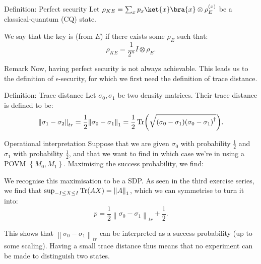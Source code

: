 \documentclass[a4paper]{article}
\begin{document}
\begin{parag}{Definition: Perfect security}
    Let $\rho_{KE} = \sum_{x} p_x \ket{x}\bra{x} \otimes \rho_E^{\left(x\right)}$ be a classical-quantum (CQ) state.

    We say that the key is  (from $E$) if there exists some $\rho_E$ such that:
    \[\rho_{KE} = \frac{1}{2^n} I \otimes \rho_E.\]

    \begin{subparag}{Remark}
        Now, having perfect security is not always achievable. This leads us to the definition of $\epsilon$-security, for which we first need the definition of trace distance.
    \end{subparag}
\end{parag}

\begin{parag}{Definition: Trace distance}
    Let $\sigma_0, \sigma_1$ be two density matrices. Their trace distance is defined to be: 
    \[\left\|\sigma_1 - \sigma_2\right\|_{tr} = \frac{1}{2} \left\|\sigma_0 - \sigma_1\right\|_1 = \frac{1}{2} \Tr\left(\sqrt{\left(\sigma_0 - \sigma_1\right)\left(\sigma_0 - \sigma_1\right)^{\dagger}}\right).\]

    \begin{subparag}{Operational interpretation}
        Suppose that we are given $\sigma_0$ with probability $\frac{1}{2}$ and $\sigma_1$ with probability $\frac{1}{2}$, and that we want to find in which case we're in using a POVM $\left\{M_0, M_1\right\}$. Maximising the success probability, we find: 

        We recognise this maximisation to be a SDP. As seen in the third exercise series, we find that $\sup_{-I \leq X \leq I} \Tr\left(AX\right) = \left\|A\right\|_1$, which we can symmetrise to turn it into: 
        \[p = \frac{1}{2} \left\|\sigma_0 - \sigma_1\right\|_{tr} + \frac{1}{2}.\]
        
        This shows that $\left\|\sigma_0 - \sigma_1\right\|_{tr}$ can be interpreted as a success probability (up to some scaling). Having a small trace distance thus means that no experiment can be made to distinguish two states.
    \end{subparag}
\end{parag}
\end{document}
